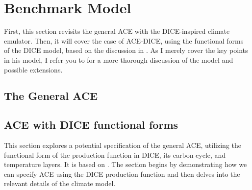 \section{Benchmark Model}

First, this section revisits the general ACE with the DICE-inspired climate emulator. Then, it will cover the case of ACE-DICE, using the functional forms of the DICE model, based on the discussion in \textcite{traeger2021analytic_discussion}. As I merely cover the key points in his model, I refer you to \textcite{TraegerChristian2023ACE, traeger2021analytic_discussion} for a more thorough discussion of the model and possible extensions. 

\subsection{The General ACE}




\subsection{ACE with DICE functional forms}
\label{subsec:ace_with_dice_dunc_forms}

This section explores a potential specification of the general ACE, utilizing the functional form of the production function in DICE, its carbon cycle, and temperature layers. It is based on \textcite{traeger2021analytic_discussion}. The section begins by demonstrating how we can specify ACE using the DICE production function and then delves into the relevant details of the climate model.





